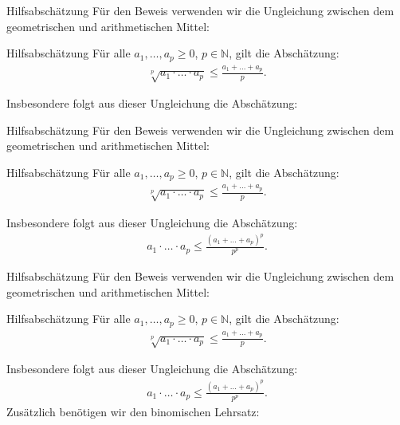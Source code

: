 \documentclass[10pt]{beamer}
\def\bN{\mathbb{N}}
\begin{document}
\begin{frame}{Hilfsabschätzung}
    Für den Beweis verwenden wir die Ungleichung zwischen dem geometrischen und arithmetischen Mittel:
    \begin{block}{Hilfsabschätzung}
        Für alle \( a_{1}, \ldots, a_{p} \geq 0 \), \( p \in \bN \), gilt die Abschätzung:
        \begin{align*}
            \sqrt[p]{a_{1} \cdot \ldots \cdot a_{p}} 
            \leq \frac{a_{1} + \ldots + a_{p}}{p}.
        \end{align*}
    \end{block}
    Insbesondere folgt aus dieser Ungleichung die Abschätzung:
\end{frame}



\begin{frame}{Hilfsabschätzung}
    Für den Beweis verwenden wir die Ungleichung zwischen dem geometrischen und arithmetischen Mittel:
    \begin{block}{Hilfsabschätzung}
        Für alle \( a_{1}, \ldots, a_{p} \geq 0 \), \( p \in \bN \), gilt die Abschätzung:
        \begin{align*}
            \sqrt[p]{a_{1} \cdot \ldots \cdot a_{p}} 
            \leq \frac{a_{1} + \ldots + a_{p}}{p}.
        \end{align*}
    \end{block}
    Insbesondere folgt aus dieser Ungleichung die Abschätzung:
    \begin{align*}
        a_{1} \cdot \ldots \cdot a_{p} 
        \leq \frac{\left( a_{1} + \ldots + a_{p} \right)^{p}}{p^{p}}.
    \end{align*}
\end{frame}



\begin{frame}{Hilfsabschätzung}
    Für den Beweis verwenden wir die Ungleichung zwischen dem geometrischen und arithmetischen Mittel:
    \begin{block}{Hilfsabschätzung}
        Für alle \( a_{1}, \ldots, a_{p} \geq 0 \), \( p \in \bN \), gilt die Abschätzung:
        \begin{align*}
            \sqrt[p]{a_{1} \cdot \ldots \cdot a_{p}} 
            \leq \frac{a_{1} + \ldots + a_{p}}{p}.
        \end{align*}
    \end{block}
    Insbesondere folgt aus dieser Ungleichung die Abschätzung:
    \begin{align*}
        a_{1} \cdot \ldots \cdot a_{p} 
        \leq \frac{\left( a_{1} + \ldots + a_{p} \right)^{p}}{p^{p}}.
    \end{align*}
    Zusätzlich benötigen wir den binomischen Lehrsatz:
\end{frame}
\end{document}

